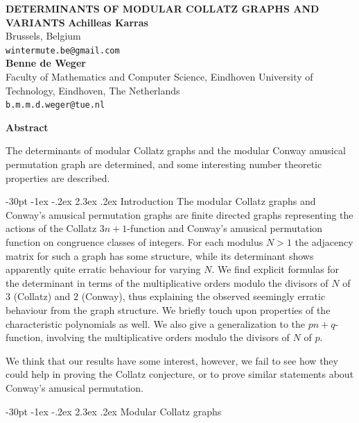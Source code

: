 \documentclass[10pt]{article}
\makeatletter
\renewcommand\section{\@startsection {section}{1}{\z@}
{-30pt \@plus -1ex \@minus -.2ex}
{2.3ex \@plus.2ex}
{\normalfont\normalsize\bfseries\boldmath}}
\theoremstyle{definition}
\makeatother
\begin{document}
\begin{center}
\uppercase{\bf \boldmath Determinants of modular Collatz graphs and variants}
\vskip 20pt
{\bf Achilleas Karras}\\
{\smallit Brussels, Belgium}\\
{\tt wintermute.be@gmail.com}\\
\vskip 10pt
{\bf Benne de Weger}\\
{\smallit Faculty of Mathematics and Computer Science, Eindhoven University of
    Technology, Eindhoven, The Netherlands}\\
{\tt b.m.m.d.weger@tue.nl}\\
\end{center}

\centerline{\bf Abstract}
\noindent
The determinants of modular Collatz graphs and the modular Conway amusical permutation graph are
determined, and some interesting number theoretic properties are described.

\pagestyle{myheadings}
\thispagestyle{empty}
\baselineskip=12.875pt
\vskip 30pt


\section{Introduction}
The modular Collatz graphs and Conway's amusical permutation graphs are finite directed graphs
representing the actions of the Collatz $ 3n+1 $-function and Conway's amusical permutation function on
congruence classes of integers. For each modulus $ N > 1 $ the adjacency matrix for such a graph has some
structure, while its determinant shows apparently quite erratic behaviour for varying $ N $. We find
explicit formulas for the determinant in terms of the multiplicative orders modulo the divisors of $ N $ of
$ 3 $ (Collatz) and $ 2 $ (Conway), thus explaining the observed seemingly erratic behaviour from the graph
structure. We briefly touch upon properties of the characteristic polynomials as well. We also give a
generalization to the $ p n + q $-function, involving the multiplicative orders modulo the divisors of
$ N $ of $ p $.

We think that our results have some interest, however, we fail to see how they could help in proving the
Collatz conjecture, or to prove similar statements about Conway's amusical permutation.

\section{Modular Collatz graphs}
\end{document}
